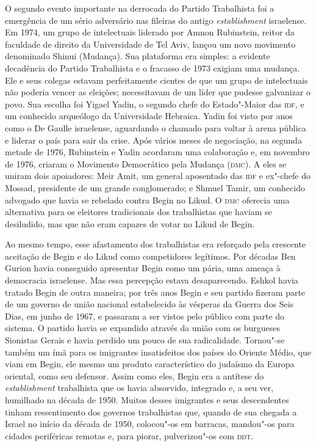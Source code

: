O segundo evento importante na derrocada do Partido Trabalhista foi a
emergência de um sério adversário nas fileiras do antigo
\textit{establishment} israelense. Em 1974, um grupo de intelectuais
liderado por Amnon Rubinstein, reitor da faculdade de direito da
Universidade de Tel Aviv, lançou um novo movimento denominado Shinui
(Mudança). Sua plataforma era simples: a evidente decadência do Partido
Trabalhista e o fracasso de 1973 exigiam uma mudança. Ele e seus
colegas estavam perfeitamente cientes de que um grupo de intelectuais não
poderia vencer as eleições; necessitavam de um líder que pudesse
galvanizar o povo. Sua escolha foi Yigael Yadin, o segundo chefe do
Estado"-Maior das \textsc{idf}, e um conhecido arqueólogo da Universidade
Hebraica. Yadin foi visto por anos como o De Gaulle israelense,
aguardando o chamado para voltar à arena pública e liderar o país para
sair da crise. Após vários meses de negociação, na segunda metade de
1976, Rubinstein e Yadin acordaram uma colaboração e, em novembro de
1976, criaram o Movimento Democrático pela Mudança (\textsc{dmc}). A eles se
uniram dois apoiadores: Meir Amit, um general aposentado das \textsc{idf} e
ex"-chefe do Mossad, presidente de um grande conglomerado; e Shmuel
Tamir, um conhecido advogado que havia se rebelado contra Begin no
Likud. O \textsc{dmc} oferecia uma alternativa para os eleitores tradicionais dos
trabalhistas que haviam se desiludido, mas que não eram capazes de votar
no Likud de Begin.

Ao mesmo tempo, esse afastamento dos trabalhistas era reforçado pela
crescente aceitação de Begin e do Likud como competidores legítimos. Por
décadas Ben Gurion havia conseguido apresentar Begin como um pária,
uma ameaça à democracia israelense. Mas essa percepção estava
desaparecendo. Eshkol havia tratado Begin de outra maneira; por três
anos Begin e seu partido fizeram parte de um governo de união nacional
estabelecido às vésperas da Guerra dos Seis Dias, em junho de 1967, e
passaram a ser vistos pelo público com parte do sistema. O partido havia
se expandido através da união com os burgueses Sionistas Gerais e havia
perdido um pouco de sua radicalidade. Tornou"-se também um ímã para os
imigrantes insatisfeitos dos países do Oriente Médio, que viam em Begin,
ele mesmo um produto característico do judaísmo da Europa oriental, como
seu defensor. Assim como eles, Begin era a antítese do
\textit{establishment} trabalhista que os havia absorvido, integrado e, a
seu ver, humilhado na década de 1950. Muitos desses imigrantes e seus
descendentes tinham ressentimento dos governos trabalhistas que, quando
de sua chegada a Israel no início da década de 1950, colocou"-os em
barracas, mandou"-os para cidades periféricas remotas e, para piorar,
pulverizou"-os com \textsc{ddt}.

